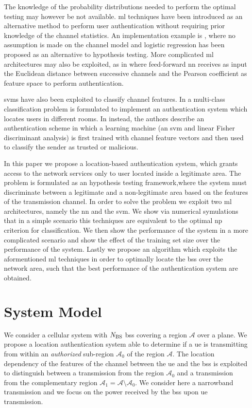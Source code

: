 \documentclass[twocolumns]{IEEEtran}
\begin{document}
The knowledge of the probability distributions needed to perform the optimal testing may however be not available. \ac{ml} techniques have been introduced as an alternative method to perform user authentication without requiring prior knowledge of the channel statistics. An implementation example is \cite{xiao-2018}, where no assumption is made on the channel model and logistic regression has been proposed as an alternative to hypothesis testing. More complicated \ac{ml} architectures may also be exploited, as in \cite{Wang-17} where feed-forward \ac{nn} receives as input the Euclidean distance between successive channels and the Pearson coefficient as feature space to perform authentication. 

\Acp{svm} have also been exploited to classify channel features. In \cite{tian2015robust} a multi-class classification problem is formulated to implement an authentication system which locates users in different rooms. In \cite{pei2014channel} instead, the authors describe an authentication scheme in which a learning machine (an \ac{svm} and linear Fisher discriminant analysis) is first trained with channel feature vectors and then used to classify the sender as trusted or malicious. 

In this paper we propose a location-based authentication system, which grants access to the network services only to user located inside a legitimate area. The problem is formulated as an hypothesis testing framework,where the system must discriminate between a legitimate and a non-legitimate area based on the features of the transmission channel. In order to solve the problem we exploit two \ac{ml} architectures, namely the \ac{nn} and the \ac{svm}. We show via numerical symulations that in a simple scenario this techniques are equivalent to the optimal \ac{np} criterion for classification. We then show the performance of the system in a more complicated scenario and show the effect of the training set size over the performance of the system. Lastly we propose an algorithm which exploits the aformentioned \ac{ml} techniques in order to optimally locate the \acp{bs} over the network area, such that the best performance of the authentication system are obtained.



\section{System Model}
We consider a cellular system with $N_{\rm BS}$ \acp{bs} covering a region $\mathcal{A}$ over a plane. We propose a location authentication system able to determine if a \ac{ue} is transmitting from within an {\em authorized} sub-region $\mathcal{A}_0$ of the region $\mathcal{A}$. The location dependency of the features of the channel between the \ac{ue} and the \acp{bs} is exploited to distinguish between a transmission from the region $\mathcal{A_0}$ and a transmission from the complementary region $\mathcal{A}_1=\mathcal{A} \setminus \mathcal{A}_0$. We consider here a narrowband transmission and we focus on the power received by the \acp{bs} upon \ac{ue} transmission.
\end{document}
